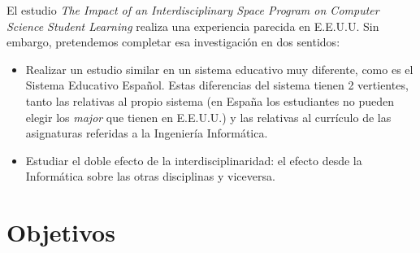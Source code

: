 \documentclass[palatino,miniheader]{apuntesURJC}
\begin{document}
El estudio \textit{The Impact of an Interdisciplinary Space Program on Computer Science Student Learning} \cite{Interdiscipline} realiza una experiencia parecida en E.E.U.U. Sin embargo, pretendemos completar esa investigación en dos sentidos: 
\begin{itemize}
	\item Realizar un estudio similar en un sistema educativo muy diferente, como es el Sistema Educativo Español. 
	Estas diferencias del sistema tienen 2 vertientes, tanto las relativas al propio sistema (en España los estudiantes no pueden elegir los \textit{major} que tienen en E.E.U.U.) y las relativas al currículo de las asignaturas referidas a la Ingeniería Informática.
	\item Estudiar el doble efecto de la interdisciplinaridad: el efecto desde la Informática sobre las otras disciplinas y viceversa.
\end{itemize}




\chapter{Objetivos}
\end{document}
